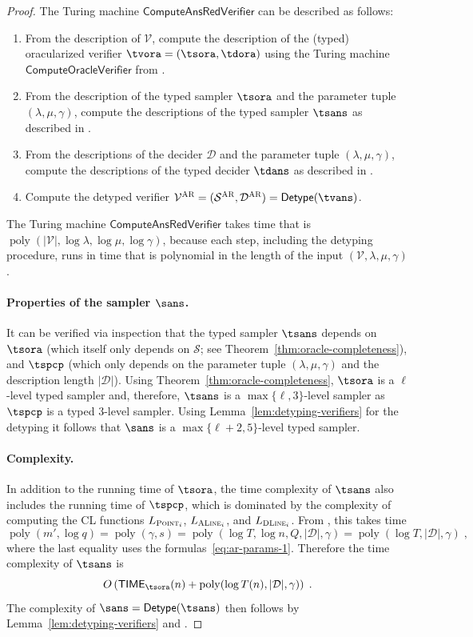 \documentclass[11pt]{article}
\theoremstyle{definition}
\DeclareMathOperator{\poly}{poly}
\newcommand{\sampler}{\mathcal{S}}
\newcommand{\decider}{\mathcal{D}}
\newcommand{\verifier}{\mathcal{V}}
\newcommand{\gamestyle}[1]{\ensuremath{\textsc{#1}}\xspace}
\newcommand{\ar}{\gamestyle{AR}}
\newcommand{\typestyle}[1]{\ensuremath{\textsc{#1}}\xspace}
\newcommand{\Point}{\typestyle{Point}}
\newcommand{\ALine}{\typestyle{ALine}}
\newcommand{\DLine}{\typestyle{DLine}}
\newcommand{\TIME}{\mathsf{TIME}}
\newcommand{\tmstyle}[1]{\ensuremath{\mathsf{#1}}}
\newcommand{\ComputeOracleVerifier}{\tmstyle{ComputeOracleVerifier}}
\newcommand{\ComputeAnsVerifier}{\tmstyle{ComputeAnsRedVerifier}}
\newcommand{\detype}{\tmstyle{Detype}}
\begin{document}
\begin{proof}
The Turing machine $\ComputeAnsVerifier$ can be described as follows: 
\begin{enumerate}
\item From the description of $\verifier$, compute the description of the
  (typed) oracularized verifier $\tvora = (\tsora,\tdora)$ using the Turing
  machine $\ComputeOracleVerifier$ from .
\item From the description of the typed sampler $\tsora$ and the parameter tuple
  $(\lambda,\mu,\gamma)$, compute the descriptions of the typed sampler $\tsans$
  as described in .
\item From the descriptions of the decider $\decider$ and the parameter tuple
  $(\lambda,\mu,\gamma)$, compute the descriptions of the typed decider $\tdans$
  as described in .
\item Compute the detyped verifier $\verifier^\ar = (\sampler^\ar,\decider^\ar)
  = \detype(\tvans)$.
\end{enumerate}
The Turing machine $\ComputeAnsVerifier$ takes time that is
$\poly(|\verifier|,\log \lambda,\log \mu,\log \gamma)$, because each step,
including the detyping procedure, runs in time that is polynomial in the length
of the input $(\verifier,\lambda,\mu,\gamma)$.

\paragraph{Properties of the sampler $\sans$.}
It can be verified via inspection that the typed sampler $\tsans$ depends on
$\tsora$ (which itself only depends on $\sampler$; see
Theorem~\ref{thm:oracle-completeness}), and $\tspcp$ (which only depends on the
parameter tuple $(\lambda,\mu,\gamma)$ and the description length $|\decider|$).
Using Theorem~\ref{thm:oracle-completeness}, $\tsora$ is a $\ell$-level typed
sampler and, therefore, $\tsans$ is a $\max\{\ell, 3\}$-level sampler as
$\tspcp$ is a typed $3$-level sampler.
Using Lemma~\ref{lem:detyping-verifiers} for the detyping it follows that
$\sans$ is a $\max\{\ell+2, 5\}$-level typed sampler.
  
\paragraph{Complexity.}
In addition to the running time of $\tsora$, the time complexity of $\tsans$
also includes the running time of $\tspcp$, which is dominated by the complexity
of computing the CL functions $L_{\Point_i}$, $L_{\ALine_i}$, and $L_{\DLine_i}$.
From , this takes time 
\[ \poly(m', \log q) =
\poly(\gamma,s) = \poly(\log T, \log n, Q, |\decider| ,\gamma) = \poly(\log
T,|\decider|,\gamma)\;,\]
where the last equality uses the formulas~\eqref{eq:ar-params-1}. Therefore the time complexity of $\tsans$ is
\[
	O \left ( \TIME_{\tsora}(n) + \poly(\log T(n),|\decider|,\gamma) \right)\;.
\] 
The complexity of $\sans = \detype(\tsans)$ then follows by
Lemma~\ref{lem:detyping-verifiers} and .




\end{proof}
\end{document}
